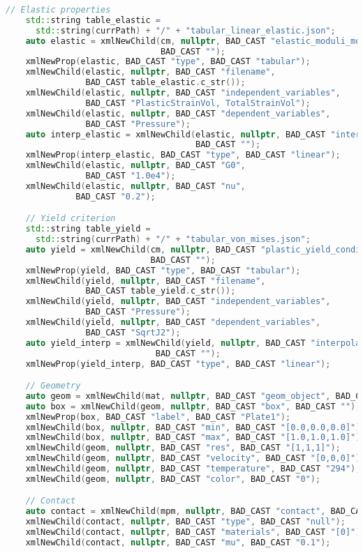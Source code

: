 \begin{enumerate}
\begin{lstlisting}[language=Cpp]
    // Elastic properties
    std::string table_elastic = 
      std::string(currPath) + "/" + "tabular_linear_elastic.json";
    auto elastic = xmlNewChild(cm, nullptr, BAD_CAST "elastic_moduli_model", 
                               BAD_CAST "");
    xmlNewProp(elastic, BAD_CAST "type", BAD_CAST "tabular");
    xmlNewChild(elastic, nullptr, BAD_CAST "filename", 
                BAD_CAST table_elastic.c_str());
    xmlNewChild(elastic, nullptr, BAD_CAST "independent_variables", 
                BAD_CAST "PlasticStrainVol, TotalStrainVol");
    xmlNewChild(elastic, nullptr, BAD_CAST "dependent_variables", 
                BAD_CAST "Pressure");
    auto interp_elastic = xmlNewChild(elastic, nullptr, BAD_CAST "interpolation",
                                      BAD_CAST "");
    xmlNewProp(interp_elastic, BAD_CAST "type", BAD_CAST "linear");
    xmlNewChild(elastic, nullptr, BAD_CAST "G0", 
                BAD_CAST "1.0e4");
    xmlNewChild(elastic, nullptr, BAD_CAST "nu", 
              BAD_CAST "0.2");

    // Yield criterion
    std::string table_yield = 
      std::string(currPath) + "/" + "tabular_von_mises.json";
    auto yield = xmlNewChild(cm, nullptr, BAD_CAST "plastic_yield_condition", 
                             BAD_CAST "");
    xmlNewProp(yield, BAD_CAST "type", BAD_CAST "tabular");
    xmlNewChild(yield, nullptr, BAD_CAST "filename", 
                BAD_CAST table_yield.c_str());
    xmlNewChild(yield, nullptr, BAD_CAST "independent_variables", 
                BAD_CAST "Pressure");
    xmlNewChild(yield, nullptr, BAD_CAST "dependent_variables", 
                BAD_CAST "SqrtJ2");
    auto yield_interp = xmlNewChild(yield, nullptr, BAD_CAST "interpolation",
                              BAD_CAST "");
    xmlNewProp(yield_interp, BAD_CAST "type", BAD_CAST "linear");

    // Geometry
    auto geom = xmlNewChild(mat, nullptr, BAD_CAST "geom_object", BAD_CAST "");
    auto box = xmlNewChild(geom, nullptr, BAD_CAST "box", BAD_CAST "");
    xmlNewProp(box, BAD_CAST "label", BAD_CAST "Plate1");
    xmlNewChild(box, nullptr, BAD_CAST "min", BAD_CAST "[0.0,0.0,0.0]");
    xmlNewChild(box, nullptr, BAD_CAST "max", BAD_CAST "[1.0,1.0,1.0]");
    xmlNewChild(geom, nullptr, BAD_CAST "res", BAD_CAST "[1,1,1]");
    xmlNewChild(geom, nullptr, BAD_CAST "velocity", BAD_CAST "[0,0,0]");
    xmlNewChild(geom, nullptr, BAD_CAST "temperature", BAD_CAST "294");
    xmlNewChild(geom, nullptr, BAD_CAST "color", BAD_CAST "0");

    // Contact
    auto contact = xmlNewChild(mpm, nullptr, BAD_CAST "contact", BAD_CAST "");
    xmlNewChild(contact, nullptr, BAD_CAST "type", BAD_CAST "null");
    xmlNewChild(contact, nullptr, BAD_CAST "materials", BAD_CAST "[0]");
    xmlNewChild(contact, nullptr, BAD_CAST "mu", BAD_CAST "0.1");


\end{lstlisting}
\end{enumerate}
